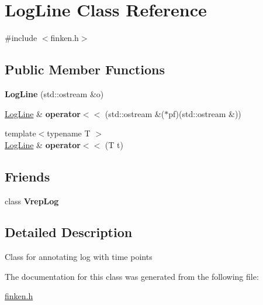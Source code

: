 \hypertarget{classLogLine}{}\section{Log\+Line Class Reference}
\label{classLogLine}


{\ttfamily \#include $<$finken.\+h$>$}

\subsection*{Public Member Functions}
\begin{DoxyCompactItemize}
\item 
{\bfseries Log\+Line} (std\+::ostream \&o)\hypertarget{classLogLine_a7f1c876fef642fffb06f646749662a04}{}\label{classLogLine_a7f1c876fef642fffb06f646749662a04}

\item 
\hyperlink{classLogLine}{Log\+Line} \& {\bfseries operator$<$$<$} (std\+::ostream \&($\ast$pf)(std\+::ostream \&))\hypertarget{classLogLine_a9697d8126ee9dd2ee3ea70bc61abf4b8}{}\label{classLogLine_a9697d8126ee9dd2ee3ea70bc61abf4b8}

\item 
{\footnotesize template$<$typename T $>$ }\\\hyperlink{classLogLine}{Log\+Line} \& {\bfseries operator$<$$<$} (T t)\hypertarget{classLogLine_aa9dff12f0c1466e53e63f981872f1e76}{}\label{classLogLine_aa9dff12f0c1466e53e63f981872f1e76}

\end{DoxyCompactItemize}
\subsection*{Friends}
\begin{DoxyCompactItemize}
\item 
class {\bfseries Vrep\+Log}\hypertarget{classLogLine_a4b85b5c9be56c4b49e99130f36f2df1d}{}\label{classLogLine_a4b85b5c9be56c4b49e99130f36f2df1d}

\end{DoxyCompactItemize}


\subsection{Detailed Description}
Class for annotating log with time points 

The documentation for this class was generated from the following file\+:\begin{DoxyCompactItemize}
\item 
\hyperlink{finken_8h}{finken.\+h}\end{DoxyCompactItemize}
